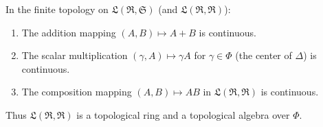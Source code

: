 In the finite topology on $\mathfrak{L}(\mathfrak{R}, \mathfrak{S})$ (and $\mathfrak{L}(\mathfrak{R}, \mathfrak{R})$):
\begin{enumerate}
\item The addition mapping $(A, B) \mapsto A + B$ is continuous.
\item The scalar multiplication $(\gamma, A) \mapsto \gamma A$ for $\gamma \in \Phi$ (the center of $\Delta$) is continuous.
\item The composition mapping $(A, B) \mapsto AB$ in $\mathfrak{L}(\mathfrak{R}, \mathfrak{R})$ is continuous.
\end{enumerate}
Thus $\mathfrak{L}(\mathfrak{R}, \mathfrak{R})$ is a topological ring and a topological algebra over $\Phi$.
